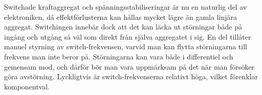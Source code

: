 Switchade kraftaggregat och spänningsstabiliseringar är nu en naturlig del
av elektroniken, då effektförlusterna kan hållas mycket lägre än gamla
linjära aggregat. Switchingen innebär dock att det kan läcka ut störningar
både på ingång och utgång så väl som direkt från själva aggregatet i sig.
En del tillåter manuel styrning av switch-frekvensen, varvid man kan flytta
störningarna till frekvens man inte beror på. Störningarna kan vara både i
differentiel och gemensam mod, och därför bör man vara uppmärksam på det när
man försöker göra avstörning. Lyckligtvis är switch-frekvenserna relativt höga,
vilket förenklar komponentval.
